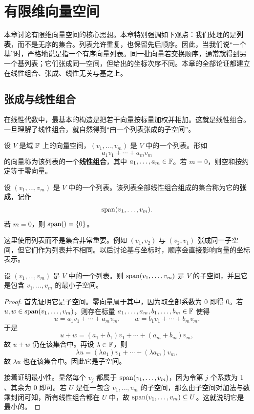 \chapter{有限维向量空间}

本章讨论有限维向量空间的核心思想。本章特别强调如下观点：我们处理的是\textbf{列表}，而不是无序的集合。列表允许重复，也保留先后顺序。因此，当我们说“一个基”时，严格地说是指一个有序向量列表。同一批向量若交换顺序，通常就得到另一个基列表；它们张成同一空间，但给出的坐标次序不同。本章的全部论证都建立在线性组合、张成、线性无关与基之上。

\section{张成与线性组合}

在线性代数中，最基本的构造是把若干向量按标量加权并相加。这就是线性组合。一旦理解了线性组合，就自然得到“由一个列表张成的子空间”。

\begin{definition} 设 $V$ 是域 $\mathbb{F}$ 上的向量空间，$(v_1,\dots,v_m)$ 是 $V$ 中的一个列表。形如
\[ a_1v_1+\cdots+a_mv_m \]
的向量称为该列表的一个\textbf{线性组合}，其中 $a_1,\dots,a_m\in\mathbb{F}$。若 $m=0$，则空和按约定等于零向量。
\end{definition}

\begin{definition} 设 $(v_1,\dots,v_m)$ 是 $V$ 中的一个列表。该列表全部线性组合组成的集合称为它的\textbf{张成}，记作
\[ \operatorname{span}(v_1,\dots,v_m). \]
若 $m=0$，则 $\operatorname{span}()=\{0\}$。
\end{definition}

\begin{remark} 这里使用列表而不是集合非常重要。例如 $(v_1,v_2)$ 与 $(v_2,v_1)$ 张成同一子空间，但它们作为列表并不相同。以后讨论基与坐标时，顺序会直接影响向量的坐标表示。
\end{remark}

\begin{proposition} 设 $(v_1,\dots,v_m)$ 是 $V$ 中的一个列表。则 $\operatorname{span}(v_1,\dots,v_m)$ 是 $V$ 的子空间，并且它是包含 $v_1,\dots,v_m$ 的最小子空间。
\end{proposition}

\begin{proof} 首先证明它是子空间。零向量属于其中，因为取全部系数为 $0$ 即得 $0$。若 $u,w\in\operatorname{span}(v_1,\dots,v_m)$，则存在标量 $a_1,\dots,a_m,b_1,\dots,b_m\in\mathbb{F}$ 使得
\[ u=a_1v_1+\cdots+a_mv_m, \qquad w=b_1v_1+\cdots+b_mv_m. \]
于是
\[ u+w=(a_1+b_1)v_1+\cdots+(a_m+b_m)v_m, \]
故 $u+w$ 仍在该集合中。再设 $\lambda\in\mathbb{F}$，则
\[ \lambda u=(\lambda a_1)v_1+\cdots+(\lambda a_m)v_m, \]
故 $\lambda u$ 也在该集合中。因此它是子空间。

接着证明最小性。显然每个 $v_j$ 都属于 $\operatorname{span}(v_1,\dots,v_m)$，因为令第 $j$ 个系数为 $1$、其余为 $0$ 即可。若 $U$ 是任一包含 $v_1,\dots,v_m$ 的子空间，那么由子空间对加法与数乘封闭可知，所有线性组合都在 $U$ 中，故 $\operatorname{span}(v_1,\dots,v_m)\subseteq U$。这就说明它是最小的。
\end{proof}

